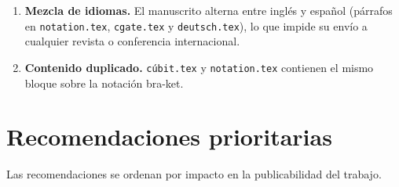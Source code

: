 \documentclass[12pt, a4paper]{article}
\begin{document}
\begin{enumerate}
  \item \textbf{Mezcla de idiomas.}
        El manuscrito alterna entre inglés y español (párrafos en
        \texttt{notation.tex}, \texttt{cgate.tex} y \texttt{deutsch.tex}),
        lo que impide su envío a cualquier revista o conferencia internacional.

  \item \textbf{Contenido duplicado.}
        \texttt{cúbit.tex} y \texttt{notation.tex} contienen el mismo bloque
        sobre la notación bra-ket.
\end{enumerate}

\section{Recomendaciones prioritarias}

Las recomendaciones se ordenan por impacto en la publicabilidad del trabajo.
\end{document}
